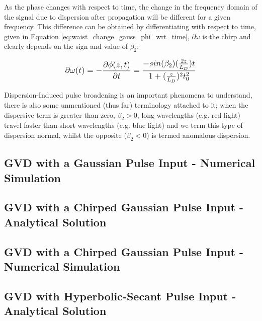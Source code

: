 \documentclass[colorlinks,11pt,a4paper,normalphoto,withhyper,ragged2e]{altareport}
\begin{document}
		\vspace{5mm}
			
	As the phase changes with respect to time, the change in the frequency domain of the signal due to dispersion after propagation will be different for a given frequency. This difference can be obtained by differentiating with respect to time, given in Equation \ref{eq:waist_change_gauss_phi_wrt_time}, $\partial \omega$ is the chirp and clearly depends on the sign and value of $\beta_2$:
						
		\begin{equation} \label{eq:waist_change_gauss_phi_wrt_time}
			\mathlarger{ \partial \omega (t) = -\frac{\partial \phi(z,t)}{\partial t}  = \frac{-sin(\beta_2)(\frac{2z}{L_D}) t}{1 + (\frac{z}{L_D})^2 t_0^2} }
		\end{equation}
			
		\vspace{5mm}
		
	Dispersion-Induced pulse broadening is an important phenomena to understand, there is also some unmentioned (thus far) terminology attached to it; when the dispersive term is greater than zero, $\beta_2 > 0$, long wavelengths (e.g. red light) travel faster than short wavelengths (e.g. blue light) and we term this type of dispersion normal, whilst the opposite ($\beta_2 < 0$) is termed anomalous dispersion. \linebreak
	
	
	
	
	\subsection{GVD with a Gaussian Pulse Input - Numerical Simulation}
	



	\pagebreak




	\subsection{GVD with a Chirped Gaussian Pulse Input - Analytical Solution}
	
	
	\subsection{GVD with a Chirped Gaussian Pulse Input - Numerical Simulation}




	\subsection{GVD with Hyperbolic-Secant Pulse Input - Analytical Solution}
	
\end{document}

